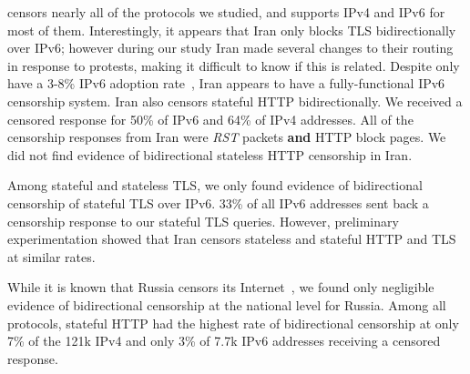 

 censors nearly all of the protocols we studied, and supports IPv4 and IPv6
for most of them. Interestingly, it appears that Iran only blocks TLS bidirectionally
over IPv6; however during our study Iran made several changes to their routing in response to protests, making it difficult to know if this is related.
Despite only have a 3-8\% IPv6
adoption rate~\cite{akamai-ipv6,Google-IPv6}, Iran appears to have a
fully-functional IPv6
censorship system. Iran also censors stateful
HTTP bidirectionally. We received a censored response for 50\% of IPv6 and 64\%
of IPv4 addresses. All of the censorship responses from Iran were \textit{RST}
packets \textbf{and} HTTP block pages. We did not find evidence of bidirectional
stateless HTTP censorship in Iran.

Among stateful and stateless TLS, we only found evidence of bidirectional censorship of stateful TLS over IPv6. 33\% of all IPv6 addresses sent back a censorship response to our stateful TLS queries. However, preliminary experimentation showed that Iran censors stateless and stateful HTTP and TLS at similar rates. %


While it is known that Russia censors its
Internet~\cite{ramesh2020decentralized}, we found only negligible evidence of
bidirectional censorship at the national level for Russia. Among all protocols,
stateful HTTP had the highest rate of bidirectional censorship at only 7\% of
the 121k IPv4 and only 3\% of 7.7k IPv6 addresses receiving a censored response.

